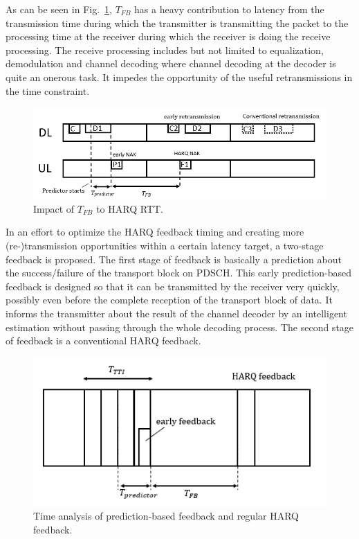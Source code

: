 \documentclass[conference]{IEEEtran}
\begin{document}
As can be seen in Fig.~\ref{fig1}, $T_{FB}$ has a heavy contribution to latency from the transmission time during which the transmitter is transmitting the packet to the processing time at the receiver during which the receiver is doing the receive processing. The receive processing includes but not limited to equalization, demodulation and channel decoding where channel decoding at the decoder is quite an onerous task. It impedes the opportunity of the useful retransmissions in the time constraint.

\begin{figure}[htbp]
\centerline{\includegraphics[scale=0.42]{fig1.png}}
\caption{Impact of $T_{FB}$ to HARQ RTT.}
\label{fig1}
\end{figure}

In an effort to optimize the HARQ feedback timing and creating more (re-)transmission opportunities within a certain latency target, a two-stage feedback is proposed. The first stage of feedback is basically a prediction about the success/failure of the transport block on PDSCH. This early prediction-based feedback is designed so that it can be transmitted by the receiver very quickly, possibly even before the complete reception of the transport block of data. It informs the transmitter about the result of the channel decoder by an intelligent estimation without passing through the whole decoding process. The second stage of feedback is a conventional HARQ feedback.

\begin{figure}[htbp]
\centerline{\includegraphics[scale=0.45]{fig2.png}}
\caption{Time analysis of prediction-based feedback and regular HARQ feedback.}
\label{fig2}
\end{figure}
\end{document}
